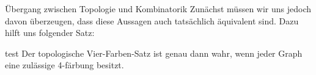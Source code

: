 \begin{chapter}{Übergang zwischen Topologie und Kombinatorik}
 Zunächst müssen wir uns jedoch davon überzeugen, dass diese Aussagen auch tatsächlich äquivalent sind. Dazu hilft uns folgender Satz: 
 
 \begin{satz}{test}
  Der topologische Vier-Farben-Satz ist genau dann wahr, wenn jeder Graph eine zulässige 4-färbung besitzt.
 \end{satz}
\end{chapter}